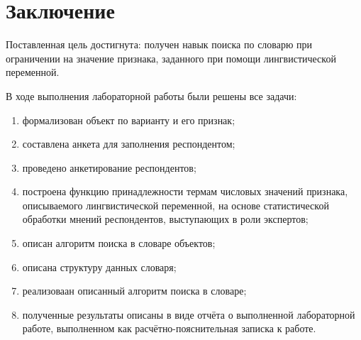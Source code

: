 
\chapter*{Заключение}

Поставленная цель достигнута: получен навык поиска по словарю при ограничении на значение признака, заданного при помощи лингвистической переменной.

В ходе выполнения лабораторной работы были решены все задачи:

\begin{enumerate}
	\item формализован объект по варианту и его признак;
	\item составлена анкета для заполнения респондентом;
	\item проведено анкетирование респондентов;
	\item построена функцию принадлежности термам числовых значений признака, описываемого лингвистической переменной, на основе статистической обработки мнений респондентов, выступающих в роли экспертов;
	\item описан алгоритм поиска в словаре объектов;
	\item описана структуру данных словаря;
	\item реализоваан описанный алгоритм поиска в словаре;
	\item полученные результаты описаны в виде отчёта о выполненной лабораторной работе, выполненном как расчётно-пояснительная записка к работе.
\end{enumerate}